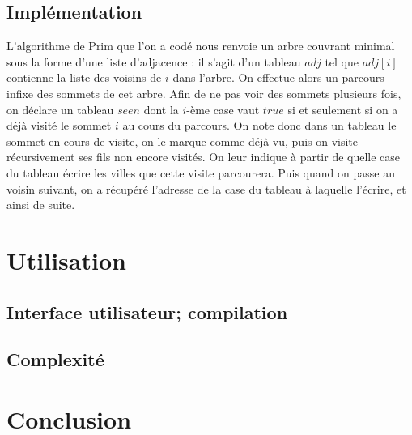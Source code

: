\documentclass{article}
\begin{document}
\subsection{Implémentation}
L'algorithme de Prim que l'on a codé nous renvoie un arbre couvrant minimal sous la forme d'une liste d'adjacence : il s'agit d'un tableau $adj$ tel que
$adj[i]$ contienne la liste des voisins de $i$ dans l'arbre.
On effectue alors un parcours infixe
des sommets de cet arbre. Afin de ne pas voir des sommets plusieurs fois, on déclare un tableau $seen$ dont la $i$-ème case vaut $true$ si et seulement si on a déjà
visité le sommet $i$ au cours du parcours. On note donc dans un tableau le sommet en cours de visite, on le marque comme déjà vu, puis on visite récursivement ses 
fils non encore visités. On leur indique à partir de quelle case du tableau écrire les villes que cette visite parcourera. Puis quand on passe au voisin suivant, on a
récupéré l'adresse de la case du tableau à laquelle l'écrire, et ainsi de suite.



\section{Utilisation}

\subsection{Interface utilisateur; compilation}

\subsection{Complexité}

\section*{Conclusion}



\end{document}
